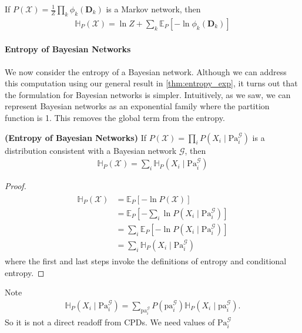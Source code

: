 \documentclass{article}
\newcommand{\bfs}[1]{\textbf{({#1}) }}
\begin{document}
\begin{cora}
 If $P(\mathcal{X})=\frac{1}{Z} \prod_{k} \phi_{k}\left(\boldsymbol{D}_{k}\right)$ is a Markov network, then
\begin{align*}
\mathbb{H}_{P}(\mathcal{X})=\ln Z+\sum_{k} \mathbb{E}_{P}\left[-\ln \phi_{k}\left(\boldsymbol{D}_{k}\right)\right]
\end{align*}
\end{cora}
\paragraph{Entropy of Bayesian Networks}
We now consider the entropy of a Bayesian network. Although we can address this computation using our general result in \cref{thm:entropy_exp}, it turns out that the formulation for Bayesian networks is simpler. Intuitively, as we saw, we can represent Bayesian networks as an exponential family where the partition function is 1. This removes the global term from the entropy.
\begin{thma}\bfs{Entropy of Bayesian Networks}\label{thm:jadffq}
If $P(\mathcal{X})=\prod_{i} P\left(X_{i} \mid \mathrm{Pa}_{i}^{\mathcal{G}}\right)$ is a distribution consistent with a Bayesian network $\mathcal{G}$, then
\begin{align*}
\mathbb{H}_{P}(\mathcal{X})=\sum_{i} \mathbb{H}_{P}\left(X_{i} \mid \mathrm{Pa}_{i}^{\mathcal{G}}\right)
\end{align*}
\end{thma}
\begin{proof}
\begin{align*}
\begin{aligned}
\mathbb{H}_{P}(\mathcal{X}) &=\mathbb{E}_{P}[-\ln P(\mathcal{X})] \\
&=\mathbb{E}_{P}\left[-\sum_{i} \ln P\left(X_{i} \mid \mathrm{Pa}_{i}^{\mathcal{G}}\right)\right] \\
&=\sum_{i} \mathbb{E}_{P}\left[-\ln P\left(X_{i} \mid \mathrm{Pa}_{i}^{\mathcal{G}}\right)\right] \\
&=\sum_{i} \mathbb{H}_{P}\left(X_{i} \mid \mathrm{Pa}_{i}^{\mathcal{G}}\right)
\end{aligned}
\end{align*}
where the first and last steps invoke the definitions of entropy and conditional entropy.
\end{proof}
\begin{rema}
Note 
\begin{align*}
\mathbb{H}_{P}\left(X_{i} \mid \mathrm{Pa}_{i}^{\mathcal{G}}\right)=\sum_{\mathrm{pa}_{i}^{\mathcal{G}}} P\left(\mathrm{pa}_{i}^{\mathcal{G}}\right) \mathbb{H}_{P}\left(X_{i} \mid \mathrm{pa}_{i}^{\mathcal{G}}\right) .
\end{align*}
So it is not a direct readoff from CPDs. We need values of $\mathrm{Pa}_{i}^{\mathcal{G}}$
\end{rema}
\end{document}
